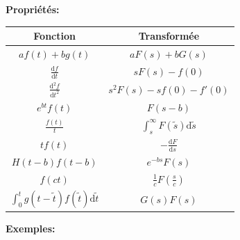 \textbf{Propriétés:}
\begin{center}
    \renewcommand{\arraystretch}{1.5}
    \begin{tabular}{cc}
        \toprule
        Fonction                                                & Transformée                                     \\
        \midrule
        $af(t)+bg(t)$                                           & $aF(s)+bG(s)$                                   \\
        $\frac{\mathrm{d}f}{\mathrm{d}t}$                       & $sF(s)-f(0)$                                    \\
        $\frac{\mathrm{d}^2f}{\mathrm{d}t^2}$                   & $s^2F(s)-sf(0)-f'(0)$                           \\
        $e^{bt}f(t)$                                            & $F(s-b)$                                        \\
        $\frac{f(t)}{t}$                                        & $\int_s^\infty F(\tilde{s})\mathrm{d}\tilde{s}$ \\
        $tf(t)$                                                 & $-\frac{\mathrm{d}F}{\mathrm{d}s}$              \\
        $H(t-b)f(t-b)$                                          & $e^{-bs}F(s)$                                   \\
        $f(ct)$                                                 & $\frac{1}{c}F\left(\frac{s}{c}\right)$          \\
        $\int_0^tg(t-\tilde{t})f(\tilde{t})\mathrm{d}\tilde{t}$ & $G(s)F(s)$                                      \\
        \bottomrule
    \end{tabular}
\end{center}
\columnbreak
\textbf{Exemples:}
